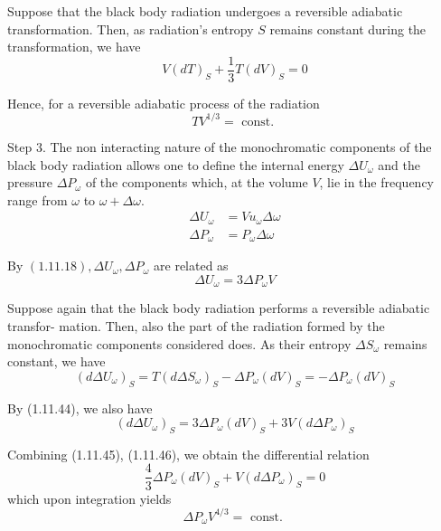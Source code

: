 \documentclass{article}
\begin{document}
Suppose that the black body radiation undergoes a reversible adiabatic transformation. Then, as radiation's entropy $S$ remains constant during the transformation, we have
$$
\begin{equation*}
V(d T)_{S}+\frac{1}{3} T(d V)_{S}=0 \tag{1.11.40}
\end{equation*}
$$

Hence, for a reversible adiabatic process of the radiation
$$
\begin{equation*}
T V^{1 / 3}=\text { const. } \tag{1.11.41}
\end{equation*}
$$

Step 3. The non interacting nature of the monochromatic components of the black body radiation allows one to define the internal energy $\Delta U_{\omega}$ and the pressure $\Delta P_{\omega}$ of the components which, at the volume $V$, lie in the frequency range from $\omega$ to $\omega+\Delta \omega$.
$$
\begin{align*}
\Delta U_{\omega} & =V u_{\omega} \Delta \omega  \tag{1.11.42}\\
\Delta P_{\omega} & =P_{\omega} \Delta \omega \tag{1.11.43}
\end{align*}
$$

By $(1.11 .18), \Delta U_{\omega}, \Delta P_{\omega}$ are related as
$$
\begin{equation*}
\Delta U_{\omega}=3 \Delta P_{\omega} V \tag{1.11.44}
\end{equation*}
$$

Suppose again that the black body radiation performs a reversible adiabatic transfor-
mation. Then, also the part of the radiation formed by the monochromatic components considered does. As their entropy $\Delta S_{\omega}$ remains constant, we have
$$
\begin{equation*}
\left(d \Delta U_{\omega}\right)_{S}=T\left(d \Delta S_{\omega}\right)_{S}-\Delta P_{\omega}(d V)_{S}=-\Delta P_{\omega}(d V)_{S} \tag{1.11.45}
\end{equation*}
$$

By (1.11.44), we also have
$$
\begin{equation*}
\left(d \Delta U_{\omega}\right)_{S}=3 \Delta P_{\omega}(d V)_{S}+3 V\left(d \Delta P_{\omega}\right)_{S} \tag{1.11.46}
\end{equation*}
$$

Combining (1.11.45), (1.11.46), we obtain the differential relation
$$
\begin{equation*}
\frac{4}{3} \Delta P_{\omega}(d V)_{S}+V\left(d \Delta P_{\omega}\right)_{S}=0 \tag{1.11.47}
\end{equation*}
$$
which upon integration yields
$$
\begin{equation*}
\Delta P_{\omega} V^{4 / 3}=\text { const. } \tag{1.11.48}
\end{equation*}
$$
\end{document}
